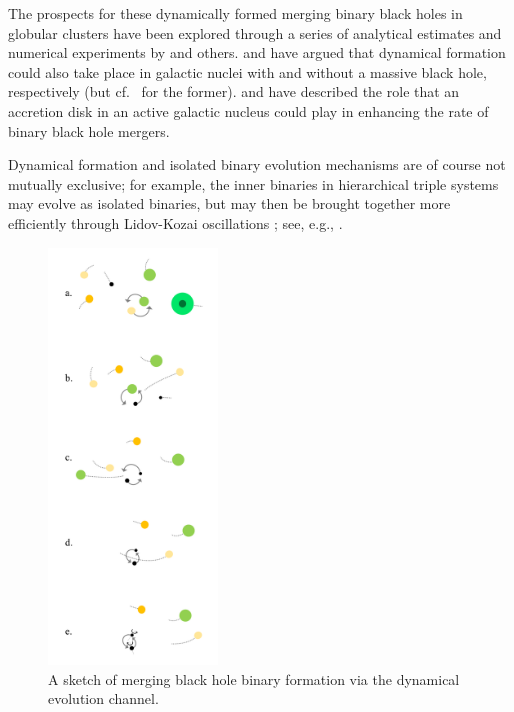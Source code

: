\documentclass[iop,onecolumn]{revtex4}
\begin{document}
The prospects for these dynamically formed merging binary black holes in globular clusters have been explored through a series of analytical estimates and numerical experiments by \citet{Sigurdsson:1993,Kulkarni:1993,PZwart:2000,OLeary:2006,Banerjee:2010,Downing:2011,Morscher:2015,Mapelli:2016,Rodriguez:2016} and others.  \citet{OLeary:2008} and \citet{MillerLauburg:2008} have argued that dynamical formation could also take place in galactic nuclei with and without a massive black hole, respectively (but cf.~\citet{Tsang:2013} for the former).  \citet{Bartos:2016} and \citet{Stone:2016} have described the role that an accretion disk in an active galactic nucleus could play in enhancing the rate of binary black hole mergers.

Dynamical formation and isolated binary evolution mechanisms are of course not mutually exclusive; for example, the inner binaries in hierarchical triple systems may evolve as isolated binaries, but may then be brought together more efficiently through Lidov-Kozai oscillations \citep{Lidov:1962,Kozai:1962}; see, e.g., \citet{PeretsKratter:2012,Belczynski:2014VMS}.

\begin{figure}
	\centering
	\includegraphics[width=0.4\textwidth]{channel3.png}
	\caption{\label{fig:dynamical} A sketch of merging black hole binary formation via the dynamical evolution channel.}
\end{figure}
\end{document}
